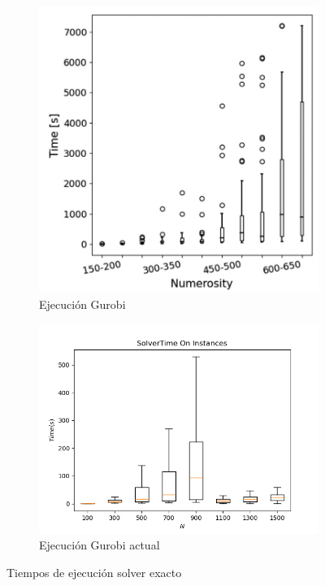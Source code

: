 \documentclass[spanish, a4paper, 12pt, openany,final]{book}
\begin{document}
\begin{figure}[h]
	\centering
	\begin{subfigure}{.5\textwidth}
		\includegraphics[width=1\linewidth]{graphs/baldo_solver_times.png}
		\caption{Ejecución Gurobi \cite{baldo_polynomial_2023}}
	\end{subfigure}%
	\begin{subfigure}{.5\textwidth}
		\includegraphics[scale=0.656]{graphs/solver_times.png}
		\caption{Ejecución Gurobi actual}
	\end{subfigure}%
	\caption{Tiempos de ejecución solver exacto}
	\label{fig:solver_times}
\end{figure}
\end{document}
